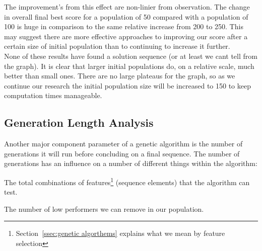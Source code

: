 The improvement's from this effect are non-linier from observation.
The change in overall final best score for a population of 50 compared with a population of 100 is huge in comparison to the same relative increase from 200 to 250.
This may suggest there are more effective approaches to improving our score after a certain size of initial population than to continuing to increase it further. \\



None of these results have found a solution sequence (or at least we cant tell from the graph). 
It is clear that larger initial populations do, on a relative scale, much better than small ones.
There are no large plateaus for the graph, so as we continue our research the initial population size will be increased to 150 to keep computation times manageable.\\


\subsection{Generation Length Analysis}
Another major component parameter of a genetic algorithm is the number of generations it will run before concluding on a final sequence.
The number of generations has an influence on a number of different things within the algorithm: 
\begin{itemize}
    \begin{item}
        The total combinations of features\footnote{Section~\ref{ssec:genetic algorthems} explains what we mean by feature selection} (sequence elements) that the algorithm can test.
    \end{item}
    \begin{item}
        The number of low performers we can remove in our population.
    \end{item}
\end{itemize}

